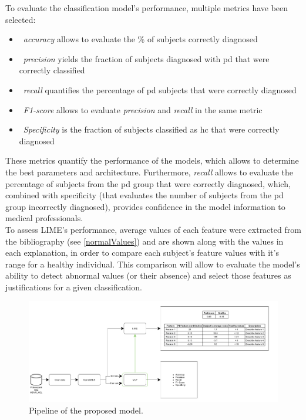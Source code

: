 To evaluate the classification model's performance, multiple metrics have been selected:

\begin{itemize}
	\item ~\textit{accuracy} allows to evaluate the \% of subjects correctly diagnosed
	\item ~\textit{precision}  yields the fraction of subjects diagnosed with \gls{pd} that were correctly classified
	\item ~\textit{recall} quantifies the percentage of \gls{pd} subjects that were correctly diagnosed
	\item ~\textit{F1-score} allows to evaluate \textit{precision} and \textit{recall} in the same metric
	\item ~\textit{Specificity} is the fraction of subjects classified as \gls{hc} that were correctly diagnosed
\end{itemize}

These metrics quantify the performance of the models, which allows to determine the best parameters and architecture. Furthermore, \textit{recall} allows to evaluate the percentage of subjects from the \gls{pd} group that were correctly diagnosed, which, combined with specificity (that evaluates the number of subjects from the \gls{pd} group incorrectly diagnosed), provides confidence in the model information to medical professionals.
\\
To assess LIME's performance, average values of each feature were extracted from the bibliography (see \ref{normalValues}) and are shown along with the values in each explanation, in order to compare each subject's feature values with it's range for a healthy individual. This comparison will allow to evaluate the model's ability to detect abnormal values (or their absence) and select those features as justifications for a given classification.

\begin{figure}[t]
	\begin{center}
		\includegraphics[clip=true, width=\textwidth]{figs/pipeline.png}
	\end{center}
	\caption{Pipeline of the proposed model.}
	\label{pipeline}
\end{figure}

\pagebreak